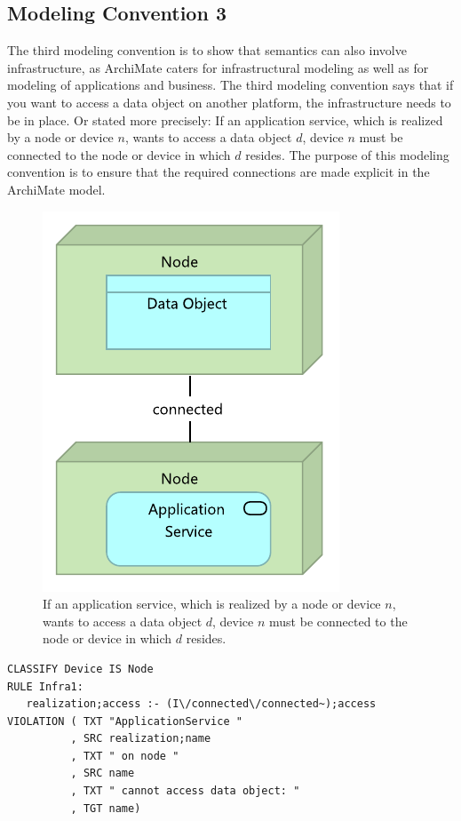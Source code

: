 \documentclass[sn-vancouver]{sn-jnl}%
\theoremstyle{thmstyleone}%
\theoremstyle{thmstyletwo}%
\theoremstyle{thmstylethree}%
\begin{document}
\subsection{Modeling Convention 3}
The third modeling convention is to show that semantics can also involve infrastructure,
as ArchiMate caters for infrastructural modeling as well as for modeling of applications and business.
The third modeling convention says that if you want to access a data object on another platform, the infrastructure needs to be in place.
Or stated more precisely:
If an application service, which is realized by a node or device $n$, wants to access a data object $d$,
device $n$ must be connected to the node or device in which $d$ resides.
The purpose of this modeling convention is to ensure that the required connections are made explicit in the ArchiMate model.

\begin{figure}[hbtp]
\centering
\includegraphics[clip=true, scale=0.7]{MC3}
\caption{\small{If an application service, which is realized by a node or device $n$, wants to access a data object $d$,
device $n$ must be connected to the node or device in which $d$ resides.}}
\label{MC3}
\end{figure}

{\small
\begin{lstlisting}[frame=single, label={mc3}, caption={}]
CLASSIFY Device IS Node
RULE Infra1:
   realization;access :- (I\/connected\/connected~);access
VIOLATION ( TXT "ApplicationService "
          , SRC realization;name
          , TXT " on node "
          , SRC name
          , TXT " cannot access data object: "
          , TGT name)
\end{lstlisting}
}
\end{document}
